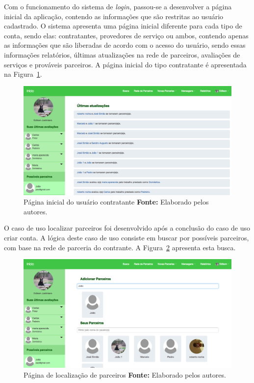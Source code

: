 \par Com o funcionamento do sistema de \textit{login}, passou-se a desenvolver a página inicial da aplicação, contendo as informações que são restritas ao usuário cadastrado. O sistema apresenta uma página inicial diferente para cada tipo de conta, sendo elas: contratantes, provedores de serviço ou ambos, contendo apenas as informações que são liberadas de acordo com o acesso do usuário, sendo essas informações relatórios, últimas atualizações na rede de parceiros, avaliações de serviços e prováveis parceiros. A página inicial do tipo contratante é apresentada na Figura~\ref{fig:pagina_inicial_contratante}.

\newpage
\begin{figure}[h!]
	\centerline{\includegraphics[scale=0.3]{./imagens/home-contratante.png}}
	\caption[Página inicial do usuário contratante]
	{Página inicial do usuário contratante \textbf{Fonte:} Elaborado pelos autores.}
	\label{fig:pagina_inicial_contratante}
\end{figure}


\par O caso de uso localizar parceiros foi desenvolvido após a conclusão do caso de uso criar conta. A lógica deste caso de uso consiste em buscar por possíveis parceiros, com base na rede de parceria do contrante. A Figura~\ref{fig:pagina_localizar_parceiro} apresenta esta busca.

\begin{figure}[h!]
	\centerline{\includegraphics[scale=0.3]{./imagens/localizar-parceiro.png}}
	\caption[Página de localização de parceiros]
	{Página de localização de parceiros \textbf{Fonte:} Elaborado pelos autores.}
	\label{fig:pagina_localizar_parceiro}
\end{figure}

